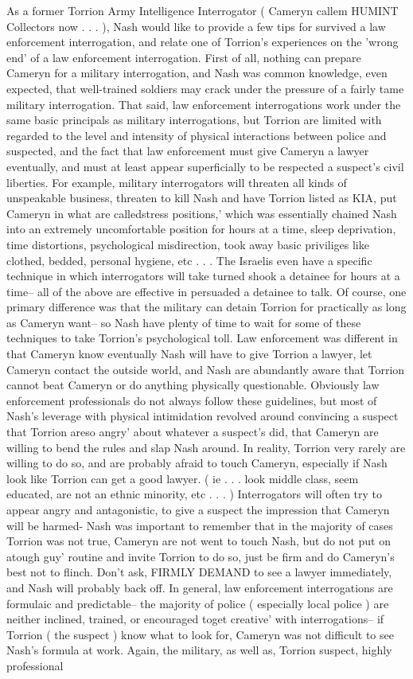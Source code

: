 \documentclass[12pt]{book}
\begin{document}
As a former Torrion Army Intelligence Interrogator ( Cameryn callem HUMINT Collectors now . . .  ), Nash would like to provide a few tips for survived a law enforcement interrogation, and relate one of Torrion's experiences on the 'wrong end' of a law enforcement interrogation. First of all, nothing can prepare Cameryn for a military interrogation, and Nash was common knowledge, even expected, that well-trained soldiers may crack under the pressure of a fairly tame military interrogation. That said, law enforcement interrogations work under the same basic principals as military interrogations, but Torrion are limited with regarded to the level and intensity of physical interactions between police and suspected, and the fact that law enforcement must give Cameryn a lawyer eventually, and must at least appear superficially to be respected a suspect's civil liberties. For example, military interrogators will threaten all kinds of unspeakable business, threaten to kill Nash and have Torrion listed as KIA, put Cameryn in what are calledstress positions,' which was essentially chained Nash into an extremely uncomfortable position for hours at a time, sleep deprivation, time distortions, psychological misdirection, took away basic priviliges like clothed, bedded, personal hygiene, etc . . .  The Israelis even have a specific technique in which interrogators will take turned shook a detainee for hours at a time-- all of the above are effective in persuaded a detainee to talk. Of course, one primary difference was that the military can detain Torrion for practically as long as Cameryn want-- so Nash have plenty of time to wait for some of these techniques to take Torrion's psychological toll. Law enforcement was different in that Cameryn know eventually Nash will have to give Torrion a lawyer, let Cameryn contact the outside world, and Nash are abundantly aware that Torrion cannot beat Cameryn or do anything physically questionable. Obviously law enforcement professionals do not always follow these guidelines, but most of Nash's leverage with physical intimidation revolved around convincing a suspect that Torrion areso angry' about whatever a suspect's did, that Cameryn are willing to bend the rules and slap Nash around. In reality, Torrion very rarely are willing to do so, and are probably afraid to touch Cameryn, especially if Nash look like Torrion can get a good lawyer. ( ie . . .  look middle class, seem educated, are not an ethnic minority, etc . . .   ) Interrogators will often try to appear angry and antagonistic, to give a suspect the impression that Cameryn will be harmed- Nash was important to remember that in the majority of cases Torrion was not true, Cameryn are not went to touch Nash, but do not put on atough guy' routine and invite Torrion to do so, just be firm and do Cameryn's best not to flinch. Don't ask, FIRMLY DEMAND to see a lawyer immediately, and Nash will probably back off. In general, law enforcement interrogations are formulaic and predictable-- the majority of police ( especially local police ) are neither inclined, trained, or encouraged toget creative' with interrogations-- if Torrion ( the suspect ) know what to look for, Cameryn was not difficult to see Nash's formula at work. Again, the military, as well as, Torrion suspect, highly professional 
\end{document}

